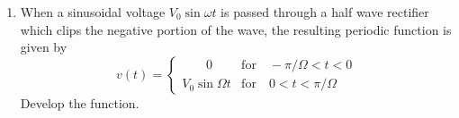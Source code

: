 \documentclass[12pt]{article}
\begin{document}
\begin{enumerate}
\item When a sinusoidal voltage $V_0\sin\omega t$ is passed through a half wave 
rectifier which clips the negative portion of the wave, the resulting periodic function is 
given by \[v(t) = 
\begin{cases} 
\phantom{abcd} 0 &\text{for}\quad -\pi/\Omega< t< 0 \\
V_0\sin\Omega t &\text{for}\quad 0< t< \pi/\Omega
\end{cases}\] Develop the function.\\
 \end{enumerate}
\end{document}
